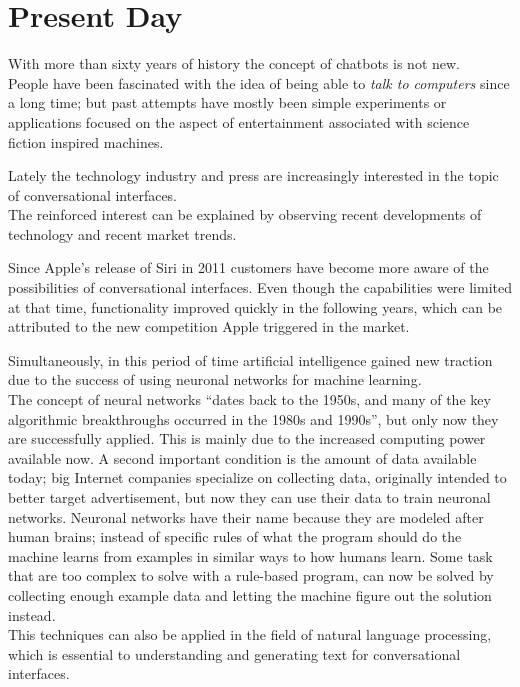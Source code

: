 \chapter{Present Day}


With more than sixty years of history the concept of chatbots is not new.
\\
People have been fascinated with the idea of being able to \emph{talk to computers} since a long time; but past attempts have mostly been simple experiments or applications focused on the aspect of entertainment associated with science fiction inspired machines.

Lately the technology industry and press are increasingly interested in the topic of conversational interfaces.
\\
The reinforced interest can be explained by observing recent developments of technology and recent market trends.

Since Apple's release of Siri in 2011\cite{iphonelaunch} customers have become more aware of the possibilities of conversational interfaces. Even though the capabilities were limited at that time, functionality improved quickly in the following years, which can be attributed to the new competition Apple triggered in the market.

Simultaneously, in this period of time artificial intelligence gained new traction due to the success of using neuronal networks for machine learning\cite{mltrend}.
\\
The concept of neural networks ``dates back to the 1950s, and many of the key algorithmic breakthroughs occurred in the 1980s and 1990s''\cite{airevolution}, but only now they are successfully applied. This is mainly due to the increased computing power available now. A second important condition is the amount of data available today; big Internet companies specialize on collecting data, originally intended to better target advertisement, but now they can use their data to train neuronal networks. Neuronal networks have their name because they are modeled after human brains; instead of specific rules of what the program should do the machine learns from examples in similar ways to how humans learn. Some task that are too complex to solve with a rule-based program, can now be solved by collecting enough example data and letting the machine figure out the solution instead.
\\
This techniques can also be applied in the field of natural language processing, which is essential to understanding and generating text for conversational interfaces.
\\

